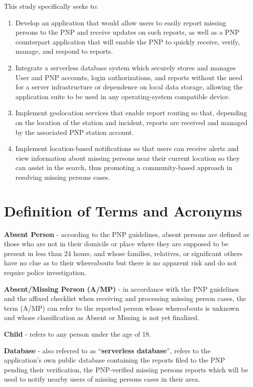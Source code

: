 This study specifically seeks to:

\begin{enumerate}
   \item Develop an application that would allow users to easily report missing persons to the PNP and receive updates on such reports, as well as a PNP counterpart application that will enable the PNP to quickly receive, verify, manage, and respond to reports.
   \item Integrate a serverless database system which securely stores and manages User and PNP accounts, login authorizations, and reports without the need for a server infrastructure or dependence on local data storage, allowing the application suite to be used in any operating-system compatible device.
   \item Implement geolocation services that enable report routing so that, depending on the location of the station and incident, reports are received and managed by the associated PNP station account.
   \item Implement location-based notifications so that users can receive alerts and view information about missing persons near their current location so they can assist in the search, thus promoting a community-based approach in resolving missing persons cases.
\end{enumerate}

\newpage
\section{Definition of Terms and Acronyms}

\textbf{Absent Person} - according to the PNP guidelines, absent persons are defined as those who are not in their domicile or place where they are supposed to be present in less than 24 hours, and whose families, relatives, or significant others have no clue as to their whereabouts but there is no apparent risk and do not require police investigation.

\textbf{Absent/Missing Person (\textbf{A/MP}) }- in accordance with the PNP guidelines and the affixed checklist when receiving and processing missing person cases, the term (A/MP) can refer to the reported person whose whereabouts is unknown and whose classification as Absent or Missing is not yet finalized.

\textbf{Child} - refers to any person under the age of 18.

\textbf{Database} - also referred to as “\textbf{serverless database}”, refers to the application’s own public database containing the reports filed to the PNP pending their verification, the PNP-verified missing persons reports which will be used to notify nearby users of missing persons cases in their area.


